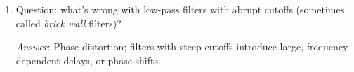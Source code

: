 \begin{enumerate}

\item Question: what's wrong with low-pass filters with abrupt
  cutoffs (sometimes called \emph{brick wall} filters)?\label{it:ch10ex1}

  \textit{Answer}: Phase distortion; filters with steep cutoffs introduce large,
  frequency dependent delays, or phase shifts.

\end{enumerate}
